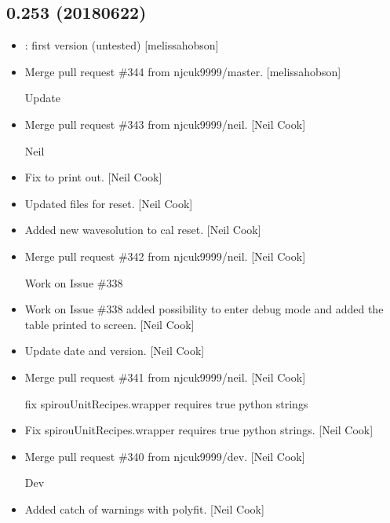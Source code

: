 \documentclass[a4paper,10pt,english]{report}
\begin{document}
\subsection{0.253 (2018\sphinxhyphen{}06\sphinxhyphen{}22)}
\label{\detokenize{misc/changelog:id431}}\begin{itemize}
\item {} 
: first version (untested) {[}melissa\sphinxhyphen{}hobson{]}

\item {} 
Merge pull request \#344 from njcuk9999/master. {[}melissa\sphinxhyphen{}hobson{]}

Update

\item {} 
Merge pull request \#343 from njcuk9999/neil. {[}Neil Cook{]}

Neil

\item {} 
Fix to print out. {[}Neil Cook{]}

\item {} 
Updated files for reset. {[}Neil Cook{]}

\item {} 
Added new wavesolution to cal reset. {[}Neil Cook{]}

\item {} 
Merge pull request \#342 from njcuk9999/neil. {[}Neil Cook{]}

Work on Issue \#338

\item {} 
Work on Issue \#338 \sphinxhyphen{} added possibility to enter debug mode and added
the table printed to screen. {[}Neil Cook{]}

\item {} 
Update date and version. {[}Neil Cook{]}

\item {} 
Merge pull request \#341 from njcuk9999/neil. {[}Neil Cook{]}

fix \sphinxhyphen{} spirouUnitRecipes.wrapper requires true python strings

\item {} 
Fix \sphinxhyphen{} spirouUnitRecipes.wrapper requires true python strings. {[}Neil
Cook{]}

\item {} 
Merge pull request \#340 from njcuk9999/dev. {[}Neil Cook{]}

Dev

\item {} 
Added catch of warnings with polyfit. {[}Neil Cook{]}


\end{itemize}
\end{document}
